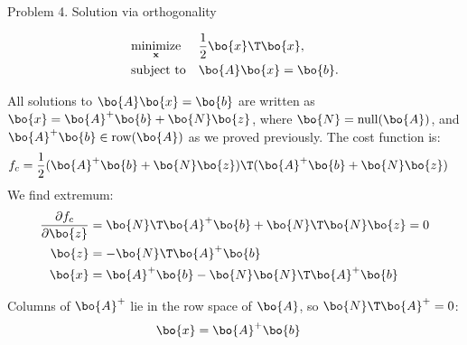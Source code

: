 \documentclass{beamer}
\begin{document}
\begin{frame}{Problem 4. Solution via orthogonality}
	\begin{flushleft}
		
		\begin{small}
		\begin{equation}
			\begin{aligned}
				& \underset{\mathbf{x}}{\text{minimize}}
				& & \frac{1}{2} \bo{x}\T \bo{x}, \\
				& \text{subject to}
				& & \bo{A} \bo{x} = \bo{b}.
			\end{aligned}
		\end{equation}
		
		All solutions to $\bo{A} \bo{x} = \bo{b}$ are written as $\bo{x} = \bo{A}^+\bo{b} + \bo{N}\bo{z}$, where $\bo{N} = \text{null}(\bo{A})$, and $\bo{A}^+\bo{b} \in \text{row}(\bo{A})$ as we proved previously.  The cost function is:
		\begin{align}
			f_c &= \frac{1}{2} (\bo{A}^+\bo{b} + \bo{N}\bo{z})\T (\bo{A}^+\bo{b} + \bo{N}\bo{z}) 
		\end{align}
		We find extremum:
		\begin{align}
			\frac{\partial f_c}{\partial \bo{z}} &= \bo{N}\T \bo{A}^+\bo{b} + \bo{N}\T\bo{N}\bo{z} = 0
			\\
			\bo{z} &= - \bo{N}\T \bo{A}^+\bo{b} 
			\\
			\bo{x} &= \bo{A}^+\bo{b} -  \bo{N}\bo{N}\T \bo{A}^+\bo{b} 
		\end{align}
		
		Columns of $\bo{A}^+$ lie in the row space of $\bo{A}$, so $\bo{N}\T \bo{A}^+ = 0$:
		\begin{align}
			\bo{x} &= \bo{A}^+\bo{b}
		\end{align}
	\end{small}
		
	\end{flushleft}
\end{frame}
\end{document}

